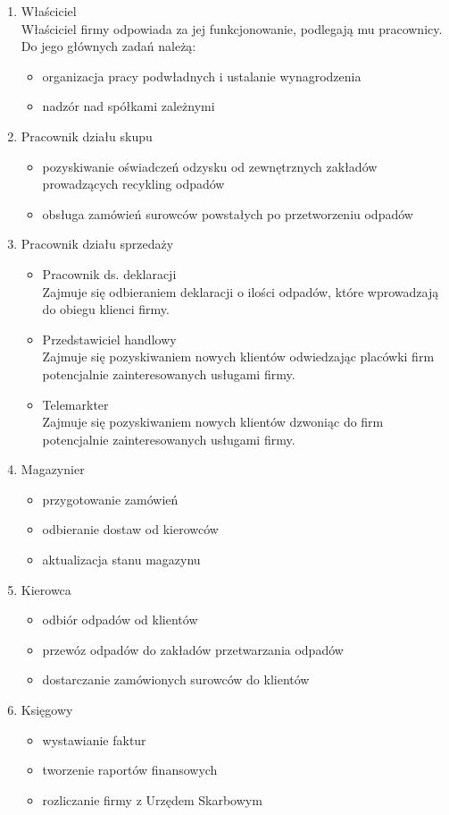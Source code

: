 
\begin{enumerate}
	\item Właściciel \\ 
	Właściciel firmy odpowiada za jej funkcjonowanie, podlegają mu pracownicy. Do jego głównych zadań należą:
		\begin{itemize}
			\item organizacja pracy podwładnych i ustalanie wynagrodzenia
			\item nadzór nad spółkami zależnymi
		\end{itemize}
	\item Pracownik działu skupu 
		\begin{itemize}
			\item pozyskiwanie oświadczeń odzysku od zewnętrznych zakładów prowadzących recykling odpadów
			\item obsługa zamówień surowców powstałych po przetworzeniu odpadów
		\end{itemize}
	\item Pracownik działu sprzedaży
		\begin{itemize}
			\item Pracownik ds. deklaracji \\
			Zajmuje się odbieraniem deklaracji o ilości odpadów, które wprowadzają do obiegu klienci firmy.
			\item Przedstawiciel handlowy\\
			Zajmuje się pozyskiwaniem nowych klientów odwiedzając placówki firm potencjalnie zainteresowanych usługami firmy.
			\item Telemarkter \\
			Zajmuje się pozyskiwaniem nowych klientów dzwoniąc do firm potencjalnie zainteresowanych usługami firmy.
		\end{itemize}
	\item Magazynier
		\begin{itemize}
			\item przygotowanie zamówień
			\item odbieranie dostaw od kierowców
			\item aktualizacja stanu magazynu
		\end{itemize}	
	\item Kierowca
		\begin{itemize}
			\item odbiór odpadów od klientów
			\item przewóz odpadów do zakładów przetwarzania odpadów
			\item dostarczanie zamówionych surowców do klientów
		\end{itemize}

	\item Księgowy
		\begin{itemize}
			\item wystawianie faktur
			\item tworzenie raportów finansowych
			\item rozliczanie firmy z Urzędem Skarbowym
		\end{itemize}
\end{enumerate}

